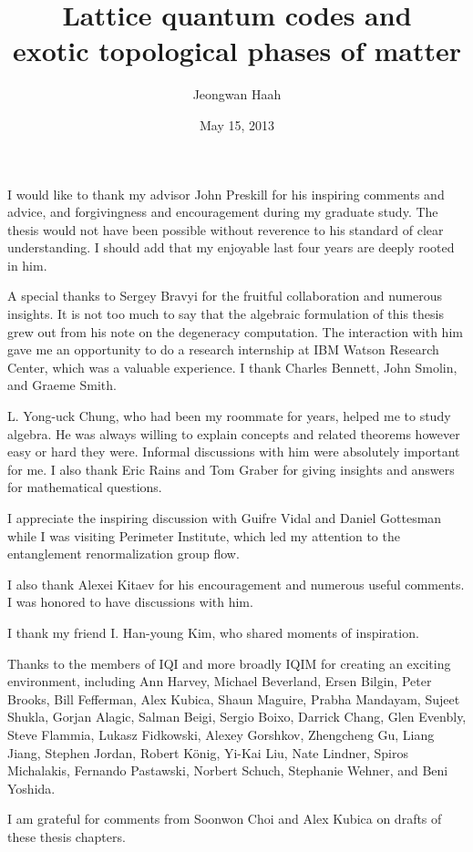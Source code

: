 \documentclass[letterpaper,10pt,defended]{cit_thesis}
\title{Lattice quantum codes and \\ exotic topological phases of matter}
\author{Jeongwan Haah}
\date{May 15, 2013}
\theoremstyle{definition} \newtheorem{defn}{Definition}[chapter]
\theoremstyle{definition} \newtheorem{rem}{Remark}[chapter]
\theoremstyle{definition} \newtheorem{example}{Example}[chapter]
\begin{document}
\maketitle


\begin{acknowledgments}
I would like to thank my advisor John Preskill for his inspiring comments and advice, 
and forgivingness and encouragement during my graduate study.
The thesis would not have been possible without reverence to his standard of clear understanding.
I should add that my enjoyable last four years are deeply rooted in him.

A special thanks to Sergey Bravyi for the fruitful collaboration and numerous insights.
It is not too much to say that the algebraic formulation of this thesis
grew out from his note on the degeneracy computation.
The interaction with him gave me an opportunity to do a research internship
at IBM Watson Research Center, which was a valuable experience.
I thank Charles Bennett, John Smolin, and Graeme Smith.

L. Yong-uck Chung, who had been my roommate for years, helped me to study algebra.
He was always willing to explain concepts and related theorems however easy or hard they were.
Informal discussions with him were absolutely important for me.
I also thank Eric Rains and Tom Graber for giving insights and answers for mathematical questions.

I appreciate the inspiring discussion with Guifre Vidal and Daniel Gottesman while I was visiting Perimeter Institute,
which led my attention to the entanglement renormalization group flow.

I also thank Alexei Kitaev for his encouragement and numerous useful comments.
I was honored to have discussions with him.

I thank my friend I. Han-young Kim, who shared moments of inspiration.

Thanks to the members of IQI and more broadly IQIM for creating an exciting environment,
including Ann Harvey,
%
Michael Beverland,
Ersen Bilgin,
Peter Brooks,
Bill Fefferman,
Alex Kubica,
Shaun Maguire,
Prabha Mandayam,
Sujeet Shukla,
%
Gorjan Alagic,
Salman Beigi,
Sergio Boixo,
Darrick Chang,
Glen Evenbly,
Steve Flammia,
Lukasz Fidkowski,
Alexey Gorshkov,
Zhengcheng Gu,
Liang Jiang,
Stephen Jordan,
Robert K\"onig,
Yi-Kai Liu,
Nate Lindner,
Spiros Michalakis,
Fernando Pastawski,
Norbert Schuch,
Stephanie Wehner,
and
Beni Yoshida.

I am grateful for comments from Soonwon Choi and Alex Kubica on drafts of these thesis chapters.
\end{acknowledgments}
\end{document}
